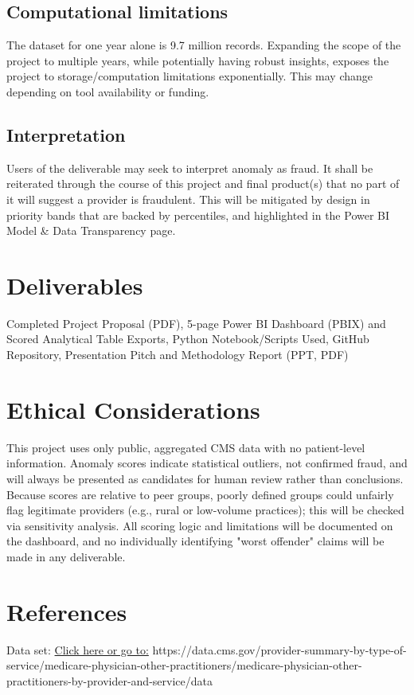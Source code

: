 \documentclass[12pt]{article}
\begin{document}
\subsection*{Computational limitations}
The dataset for one year alone is 9.7 million records. Expanding the scope of the project to multiple years, while potentially having robust insights, exposes the project to storage/computation limitations exponentially. This may change depending on tool availability or funding. 
\subsection*{Interpretation}
Users of the deliverable may seek to interpret anomaly as fraud. It shall be reiterated through the course of this project and final product(s) that no part of it will suggest a provider is fraudulent. This will be mitigated by design in priority bands that are backed by percentiles, and highlighted in the Power BI Model \& Data Transparency page. 
\section{Deliverables}

Completed Project Proposal (PDF), 5-page Power BI Dashboard (PBIX) and Scored Analytical Table Exports, Python Notebook/Scripts Used, GitHub Repository, Presentation Pitch and Methodology Report (PPT, PDF)

\section{Ethical Considerations}
This project uses only public, aggregated CMS data with no patient-level information. Anomaly scores indicate statistical outliers, not confirmed fraud, and will always be presented as candidates for human review rather than conclusions. Because scores are relative to peer groups, poorly defined groups could unfairly flag legitimate providers (e.g., rural or low-volume practices); this will be checked via sensitivity analysis. All scoring logic and limitations will be documented on the dashboard, and no individually identifying "worst offender" claims will be made in any deliverable.
\section{References}
Data set: \href{https://data.cms.gov/provider-summary-by-type-of-service/medicare-physician-other-practitioners/medicare-physician-other-practitioners-by-provider-and-service/data}{Click here or go to:}
https://data.cms.gov/provider-summary-by-type-of-service/medicare-physician-other-practitioners/medicare-physician-other-practitioners-by-provider-and-service/data
\end{document}

